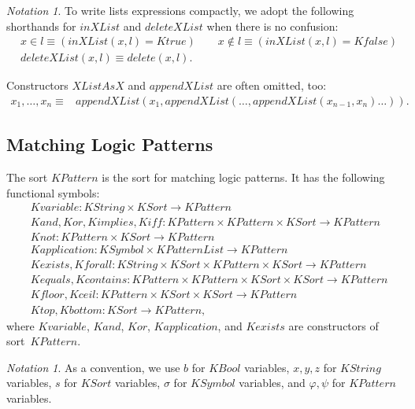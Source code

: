\documentclass[UTF8]{article}
\newcounter{thmcounter}
\theoremstyle{plain}
\theoremstyle{definition}
\theoremstyle{remark}
\newtheorem{notation}[thmcounter]{Notation}
\newcommand{\KBool}{\mathit{KBool}}
\newcommand{\Ktrue}{\mathit{Ktrue}}
\newcommand{\Kfalse}{\mathit{Kfalse}}
\newcommand{\KString}{\mathit{KString}}
\newcommand{\Kdelete}{\mathit{delete}}
\newcommand{\KSort}{\mathit{KSort}}
\newcommand{\KSymbol}{\mathit{KSymbol}}
\newcommand{\KPattern}{\mathit{KPattern}}
\newcommand{\KPatternList}{\mathit{KPatternList}}
\newcommand{\Kvariable}{\mathit{Kvariable}}
\newcommand{\Kand}{\mathit{Kand}}
\newcommand{\Kor}{\mathit{Kor}}
\newcommand{\Kimplies}{\mathit{Kimplies}}
\newcommand{\Kiff}{\mathit{Kiff}}
\newcommand{\Knot}{\mathit{Knot}}
\newcommand{\Kapplication}{\mathit{Kapplication}}
\newcommand{\Kexists}{\mathit{Kexists}}
\newcommand{\Kforall}{\mathit{Kforall}}
\newcommand{\Kequals}{\mathit{Kequals}}
\newcommand{\Kcontains}{\mathit{Kcontains}}
\newcommand{\Ktop}{\mathit{Ktop}}
\newcommand{\Kbottom}{\mathit{Kbottom}}
\newcommand{\Kfloor}{\mathit{Kfloor}}
\newcommand{\Kceil}{\mathit{Kceil}}
\begin{document}
\begin{notation}
To write lists expressions compactly, we adopt the following shorthands for $\mathit{inXList}$ and $\mathit{deleteXList}$ when there is no confusion:
\begin{align*}
&x \in l \equiv (\mathit{inXList}(x, l) = \Ktrue)
\qquad x \not\in l \equiv (\mathit{inXList}(x, l) = \Kfalse)
\\
&\mathit{deleteXList}(x, l) \equiv \Kdelete(x, l).
\end{align*}

Constructors $\mathit{XListAsX}$ and $\mathit{appendXList}$ are often omitted, too:
\begin{align*}
x_1, \dots, x_n
\equiv &\mathit{appendXList}(x_1, \mathit{appendXList}(\dots, \mathit{appendXList}(x_{n-1}, x_n)\dots)).
\end{align*}
\end{notation}

\subsection{Matching Logic Patterns}

The sort $\KPattern$ is the sort for matching logic patterns.
It has the following functional symbols:
\begin{align*}
&\Kvariable \colon \KString \times \KSort \to 
\KPattern
\\
&\Kand, \Kor, \Kimplies, \Kiff \colon \KPattern \times \KPattern \times \KSort \to \KPattern
\\
&\Knot \colon \KPattern \times \KSort \to \KPattern 
\\
&\Kapplication \colon \KSymbol \times \KPatternList \to \KPattern 
\\
&\Kexists, \Kforall \colon \KString \times \KSort \times \KPattern \times \KSort \to \KPattern 
\\
&\Kequals, \Kcontains \colon \KPattern \times 
\KPattern \times \KSort \times \KSort \to \KPattern \\
&\Kfloor, \Kceil \colon \KPattern \times \KSort \times \KSort \to \KPattern\\
&\Ktop, \Kbottom \colon \KSort \to \KPattern,
\end{align*}
where $\Kvariable$, $\Kand$, $\Kor$, $\Kapplication$, and $\Kexists$ are constructors of sort~$\KPattern$. 

\begin{notation}
	As a convention, we use $b$ for $\KBool$ variables, $x, y, z$ for $\KString$ variables, $s$ for $\KSort$ variables, $\sigma$ for $\KSymbol$ variables, and $\varphi, \psi$ for $\KPattern$ variables. 
\end{notation}
\end{document}
